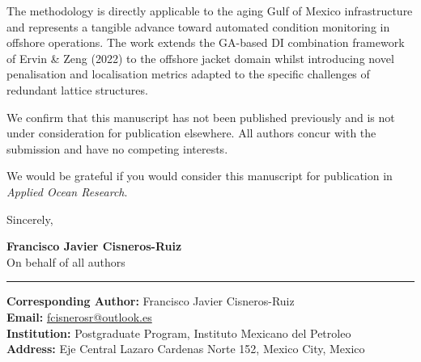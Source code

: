\documentclass[11pt]{article}
\begin{document}
The methodology is directly applicable to the aging Gulf of Mexico infrastructure and represents a tangible advance toward automated condition monitoring in offshore operations. The work extends the GA-based DI combination framework of Ervin \& Zeng (2022) to the offshore jacket domain whilst introducing novel penalisation and localisation metrics adapted to the specific challenges of redundant lattice structures.

We confirm that this manuscript has not been published previously and is not under consideration for publication elsewhere. All authors concur with the submission and have no competing interests.

We would be grateful if you would consider this manuscript for publication in \textit{Applied Ocean Research}.

\vspace{0.5cm}

Sincerely,

\vspace{1.5cm}

\noindent
\textbf{Francisco Javier Cisneros-Ruiz} \\
On behalf of all authors

\vspace{1cm}

\hrule
\vspace{0.3cm}

\noindent
\textbf{Corresponding Author:} Francisco Javier Cisneros-Ruiz \\
\textbf{Email:} \href{mailto:fcisnerosr@outlook.es}{fcisnerosr@outlook.es} \\
\textbf{Institution:} Postgraduate Program, Instituto Mexicano del Petroleo \\
\textbf{Address:} Eje Central Lazaro Cardenas Norte 152, Mexico City, Mexico
\end{document}
